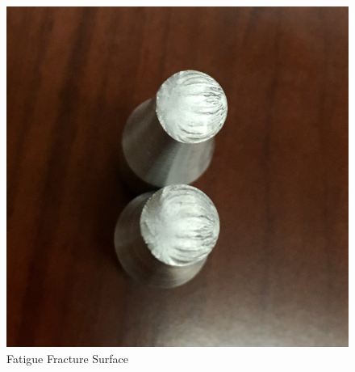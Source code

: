 \documentclass{article}
\begin{document}
\vspace{3em}
\begin{figure}[H]
\centering
    \caption{Fatigue Fracture Surface}
		\includegraphics[scale=.15]{cracksurface}
\end{figure}

\pagebreak
\end{document}
